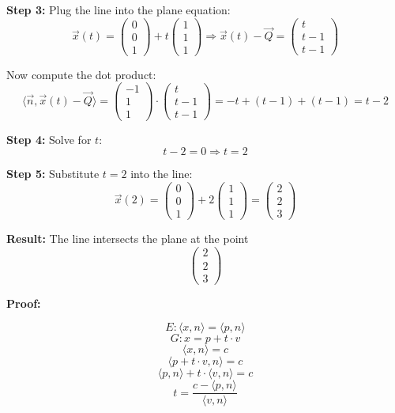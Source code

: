\textbf{Step 3:} Plug the line into the plane equation:
\[
	\vec{x}(t) = \begin{pmatrix} 0 \\ 0 \\ 1 \end{pmatrix} + t \begin{pmatrix} 1 \\ 1 \\ 1 \end{pmatrix}
	\Rightarrow
	\vec{x}(t) - \vec{Q} =
	\begin{pmatrix} t \\ t - 1 \\ t - 1 \end{pmatrix}
\]

Now compute the dot product:
\[
	\langle \vec{n}, \vec{x}(t) - \vec{Q} \rangle =
	\begin{pmatrix} -1 \\ 1 \\ 1 \end{pmatrix} \cdot \begin{pmatrix} t \\ t - 1 \\ t - 1 \end{pmatrix}
	= -t + (t - 1) + (t - 1) = t - 2
\]

\textbf{Step 4:} Solve for \( t \):
\[
	t - 2 = 0 \Rightarrow t = 2
\]

\textbf{Step 5:} Substitute \( t = 2 \) into the line:
\[
	\vec{x}(2) = \begin{pmatrix} 0 \\ 0 \\ 1 \end{pmatrix} + 2 \begin{pmatrix} 1 \\ 1 \\ 1 \end{pmatrix} =
	\begin{pmatrix} 2 \\ 2 \\ 3 \end{pmatrix}
\]

\textbf{Result:} The line intersects the plane at the point
\[
	\boxed{\begin{pmatrix} 2 \\ 2 \\ 3 \end{pmatrix}}
\]

\textbf{Proof:}

\[
	E: \langle x, n\rangle = \langle p, n \rangle
\]
\[
	G: x = p + t \cdot v
\]
\[
	\langle x, n \rangle = c
\]
\[
	\langle p + t \cdot v, n \rangle = c
\]
\[
	\langle p, n \rangle + t \cdot \langle v, n \rangle = c
\]
\[
	t = \frac{c - \langle p, n \rangle}{\langle v, n \rangle}
\]
\QED

